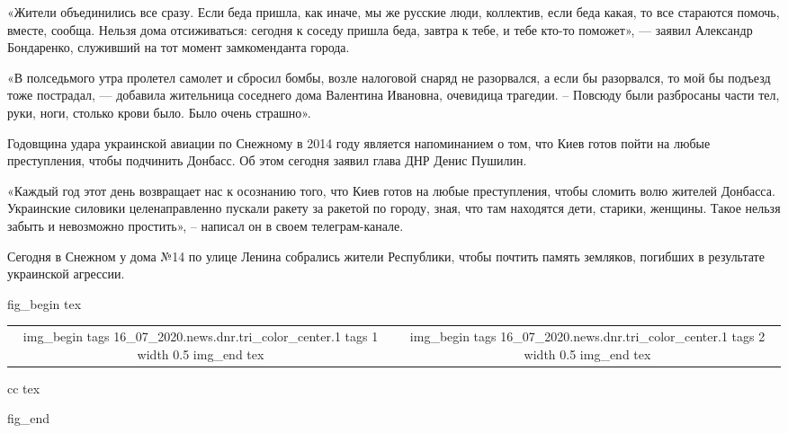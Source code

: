 «Жители объединились все сразу. Если беда пришла, как иначе, мы же русские
люди, коллектив, если беда какая, то все стараются помочь, вместе, сообща.
Нельзя дома отсиживаться: сегодня к соседу пришла беда, завтра к тебе, и тебе
кто-то поможет», — заявил Александр Бондаренко, служивший на тот момент
замкоменданта города.

«В полседьмого утра пролетел самолет и сбросил бомбы, возле налоговой снаряд не
разорвался, а если бы разорвался, то мой бы подъезд тоже пострадал, — добавила
жительница соседнего дома Валентина Ивановна, очевидица трагедии. – Повсюду
были разбросаны части тел, руки, ноги, столько крови было. Было очень страшно».

Годовщина удара украинской авиации по Снежному в 2014 году является
напоминанием о том, что Киев готов пойти на любые преступления, чтобы подчинить
Донбасс. Об этом сегодня заявил глава ДНР Денис Пушилин.

«Каждый год этот день возвращает нас к осознанию того, что Киев готов на любые
преступления, чтобы сломить волю жителей Донбасса. Украинские силовики
целенаправленно пускали ракету за ракетой по городу, зная, что там находятся
дети, старики, женщины. Такое нельзя забыть и невозможно простить», – написал
он в своем телеграм-канале.

Сегодня в Снежном у дома №14 по улице Ленина собрались жители Республики, чтобы
почтить память земляков, погибших в результате украинской агрессии.

\ifcmt
fig_begin
	tex \begin{tabular}{cc}
	img_begin 
		tags 16_07_2020.news.dnr.tri_color_center.1
		tags 1
		width 0.5
	img_end
	tex &
	img_begin 
		tags 16_07_2020.news.dnr.tri_color_center.1
		tags 2
		width 0.5
	img_end
	tex \end{tabular}{cc}
	tex \caption{\sectitle}
fig_end
\fi

  
